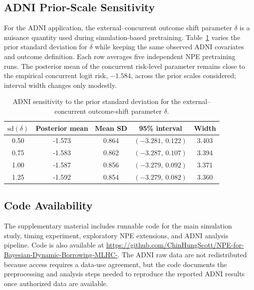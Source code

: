 \subsection{ADNI Prior-Scale Sensitivity}
\label{app:adni-sensitivity}

For the ADNI application, the external--concurrent outcome shift parameter
$\delta$ is a nuisance quantity used during simulation-based pretraining.
Table~\ref{tab:adni-delta-sensitivity} varies the prior standard deviation
for $\delta$ while keeping the same observed ADNI covariates and outcome
definition. Each row averages five independent NPE pretraining runs. The
posterior mean of the concurrent risk-level parameter remains close to the
empirical concurrent logit risk, $-1.584$, across the prior scales considered;
interval width changes only modestly.

\begin{table}[H]
\centering
\small
\caption{ADNI sensitivity to the prior standard deviation for the
external--concurrent outcome-shift parameter $\delta$.}
\label{tab:adni-delta-sensitivity}
\begin{tabular}{ccccc}
\toprule
$\mathrm{sd}(\delta)$ & Posterior mean & Mean SD & 95\% interval & Width \\
\midrule
0.50 & -1.573 & 0.864 & $(-3.281,\ 0.122)$ & 3.403 \\
0.75 & -1.583 & 0.862 & $(-3.287,\ 0.107)$ & 3.394 \\
1.00 & -1.587 & 0.856 & $(-3.279,\ 0.092)$ & 3.371 \\
1.25 & -1.592 & 0.854 & $(-3.279,\ 0.082)$ & 3.360 \\
\bottomrule
\end{tabular}
\end{table}

\subsection{Code Availability}
\label{app:code-availability}

The supplementary material includes runnable code for the main simulation
study, timing experiment, exploratory NPE extensions, and ADNI analysis
pipeline. Code is also available at
\url{https://github.com/ChinHungScott/NPE-for-Bayesian-Dynamic-Borrowing-MLHC-}.
The ADNI raw data are not redistributed because access requires a data-use
agreement, but the code documents the preprocessing and analysis steps needed
to reproduce the reported ADNI results once authorized data are available.

